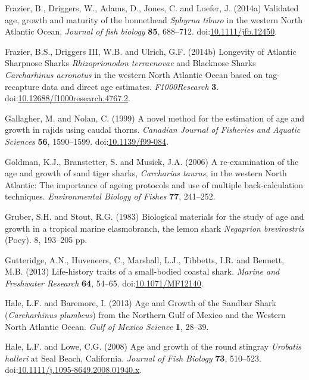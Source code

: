 \documentclass[]{article}
\begin{document}
\hypertarget{ref-frazier_validated_2014}{}
Frazier, B., Driggers, W., Adams, D., Jones, C. and Loefer, J. (2014a)
Validated age, growth and maturity of the bonnethead \emph{Sphyrna
tiburo} in the western North Atlantic Ocean. \emph{Journal of fish
biology} \textbf{85}, 688--712.
doi:\href{https://doi.org/10.1111/jfb.12450}{10.1111/jfb.12450}.

\hypertarget{ref-frazier_longevity_2014}{}
Frazier, B.S., Driggers III, W.B. and Ulrich, G.F. (2014b) Longevity of
Atlantic Sharpnose Sharks \emph{Rhizoprionodon terraenovae} and
Blacknose Sharks \emph{Carcharhinus acronotus} in the western North
Atlantic Ocean based on tag-recapture data and direct age estimates.
\emph{F1000Research} \textbf{3}.
doi:\href{https://doi.org/10.12688/f1000research.4767.2}{10.12688/f1000research.4767.2}.

\hypertarget{ref-gallagher_novel_1999}{}
Gallagher, M. and Nolan, C. (1999) A novel method for the estimation of
age and growth in rajids using caudal thorns. \emph{Canadian Journal of
Fisheries and Aquatic Sciences} \textbf{56}, 1590--1599.
doi:\href{https://doi.org/10.1139/f99-084}{10.1139/f99-084}.

\hypertarget{ref-goldman_re-examination_2006}{}
Goldman, K.J., Branstetter, S. and Musick, J.A. (2006) A re-examination
of the age and growth of sand tiger sharks, \emph{Carcharias taurus}, in
the western North Atlantic: The importance of ageing protocols and use
of multiple back-calculation techniques. \emph{Environmental Biology of
Fishes} \textbf{77}, 241--252.

\hypertarget{ref-gruber_biological_1983}{}
Gruber, S.H. and Stout, R.G. (1983) Biological materials for the study
of age and growth in a tropical marine elasmobranch, the lemon shark
\emph{Negaprion brevirostris} (Poey). 8, 193--205 pp.

\hypertarget{ref-gutteridge_life-history_2013}{}
Gutteridge, A.N., Huveneers, C., Marshall, L.J., Tibbetts, I.R. and
Bennett, M.B. (2013) Life-history traits of a small-bodied coastal
shark. \emph{Marine and Freshwater Research} \textbf{64}, 54--65.
doi:\href{https://doi.org/10.1071/MF12140}{10.1071/MF12140}.

\hypertarget{ref-hale_age_2013}{}
Hale, L.F. and Baremore, I. (2013) Age and Growth of the Sandbar Shark
(\emph{Carcharhinus plumbeus}) from the Northern Gulf of Mexico and the
Western North Atlantic Ocean. \emph{Gulf of Mexico Science} \textbf{1},
28--39.

\hypertarget{ref-hale_age_2008}{}
Hale, L.F. and Lowe, C.G. (2008) Age and growth of the round stingray
\emph{Urobatis halleri} at Seal Beach, California. \emph{Journal of Fish
Biology} \textbf{73}, 510--523.
doi:\href{https://doi.org/10.1111/j.1095-8649.2008.01940.x}{10.1111/j.1095-8649.2008.01940.x}.
\end{document}
